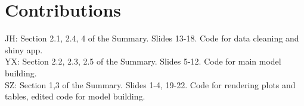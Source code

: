 \documentclass[12pt]{article}
\begin{document}
	\pagebreak
	\section*{Contributions}
	
	\noindent JH: Section 2.1, 2.4, 4 of the Summary. Slides 13-18. Code for data cleaning and shiny app. \\
	YX: Section 2.2, 2.3, 2.5 of the Summary. Slides 5-12. Code for main model building.\\
	SZ: Section 1,3 of the Summary. Slides 1-4, 19-22. Code for rendering plots and tables, edited code for model building.\\
	
	
	
	
	
	
	
\end{document}
